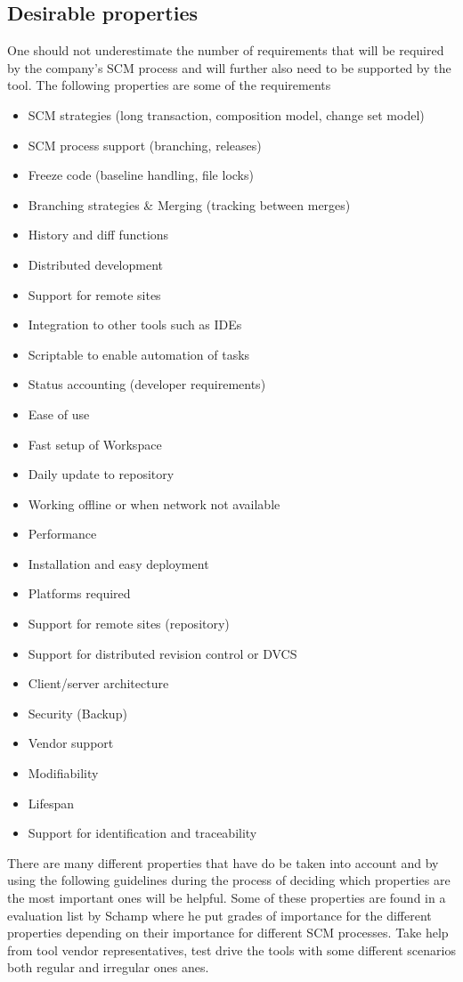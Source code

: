 \documentclass[10pt]{article}
\begin{document}
\subsection{Desirable properties}
One should not underestimate the number of requirements that will be required by the company's SCM process and will further also need to be supported by the tool. The following properties are some of the requirements 
\begin{itemize}
\item SCM strategies (long transaction, composition model, change set model)
\item SCM process support (branching, releases)
\item Freeze code (baseline handling, file locks)
\item Branching strategies \& Merging (tracking between merges)
\item History and diff functions
\item Distributed development
\item Support for remote sites
\item Integration to other tools such as IDEs
\item Scriptable to enable automation of tasks
\item Status accounting (developer requirements)
\item Ease of use
\item Fast setup of Workspace
\item Daily update to repository
\item Working offline or when network not available
\item Performance
\item Installation and easy deployment
\item Platforms required
\item Support for remote sites (repository)
\item Support for distributed revision control or DVCS
\item Client/server architecture
\item Security (Backup)
\item Vendor support
\item Modifiability
\item Lifespan
\item Support for identification and traceability
\end{itemize}
There are many different properties that have do be taken into account and by using the following guidelines during the process of deciding which properties are the most important ones will be helpful.
Some of these properties are found in a evaluation list by Schamp \cite{Schamp} where he put grades of importance for the different properties depending on their importance for different SCM processes.
Take help from tool vendor representatives, test drive the tools with some different scenarios both regular and irregular ones anes.
\end{document}
